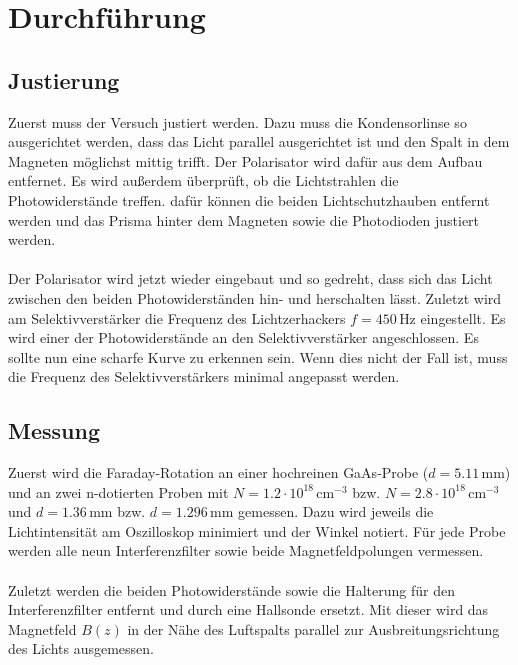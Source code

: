\section{Durchführung}
\label{sec:Durchführung}

\subsection{Justierung}
Zuerst muss der Versuch justiert werden. Dazu muss die Kondensorlinse so ausgerichtet werden, dass das Licht parallel ausgerichtet ist und 
den Spalt in dem Magneten möglichst mittig trifft. Der Polarisator wird dafür aus dem Aufbau entfernet. 
Es wird außerdem überprüft, ob die Lichtstrahlen die Photowiderstände treffen. dafür können die beiden Lichtschutzhauben entfernt werden und 
das Prisma hinter dem Magneten sowie die Photodioden justiert werden. \\
\\
Der Polarisator wird jetzt wieder eingebaut und so gedreht, dass sich das Licht zwischen den beiden Photowiderständen hin- und herschalten lässt.
Zuletzt wird am Selektivverstärker die Frequenz des Lichtzerhackers $f = 450\,\unit{\hertz}$ eingestellt. Es wird einer der Photowiderstände 
an den Selektivverstärker angeschlossen. Es sollte nun eine scharfe Kurve zu erkennen sein. Wenn dies nicht der Fall ist, muss die Frequenz des 
Selektivverstärkers minimal angepasst werden. 

\subsection{Messung}
Zuerst wird die Faraday-Rotation an einer hochreinen GaAs-Probe ($d=5.11 \,\unit{\milli\meter}$) und an zwei 
n-dotierten Proben mit $N=1.2\cdot 10^{18}\,\unit{\centi\meter}^{-3}$ bzw. $N=2.8 \cdot 10^{18}\,\unit{\centi\meter}^{-3}$ und 
$d=1.36\,\unit{\milli\meter}$ bzw. $d=1.296\,\unit{\milli\meter}$ gemessen. Dazu wird jeweils die Lichtintensität am Oszilloskop
minimiert und der Winkel notiert. Für jede Probe werden alle neun Interferenzfilter sowie beide Magnetfeldpolungen 
vermessen. \\
\\
Zuletzt werden die beiden Photowiderstände sowie die Halterung für den Interferenzfilter entfernt und durch eine Hallsonde ersetzt. Mit dieser 
wird das Magnetfeld $B(z)$ in der Nähe des Luftspalts parallel zur Ausbreitungsrichtung des Lichts ausgemessen. 